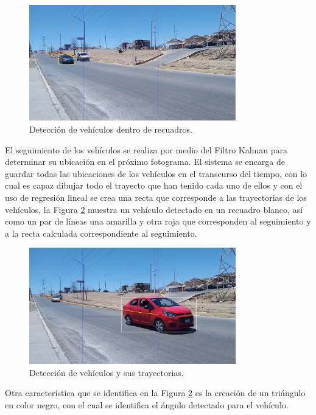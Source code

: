 \begin{figure}[H]
    \centering
    \includegraphics[width=0.8\textwidth]{Metodologia/imgs/Deteccion.jpg}
    \caption{Detección de vehículos dentro de recuadros.}
    \label{fig:LugarDeteccion}
\end{figure}

El seguimiento de los vehículos se realiza por medio del Filtro Kalman para determinar su ubicación en el próximo fotograma. El sistema se encarga de guardar todas las ubicaciones de los vehículos en el transcurso del tiempo, con lo cual es capaz dibujar todo el trayecto que han tenido cada uno de ellos y con el uso de regresión lineal se crea una recta que corresponde a las trayectorias de los vehículos, la Figura \ref{fig:LugarSeguimiento} muestra un vehículo detectado en un recuadro blanco, así como un par de líneas una amarilla y otra roja que corresponden al seguimiento y a la recta calculada correspondiente al seguimiento.

\begin{figure}[H]
    \centering
    \includegraphics[width=0.8\textwidth]{Metodologia/imgs/Seguimiento.jpg}
    \caption{Detección de vehículos y sus trayectorias.}
    \label{fig:LugarSeguimiento}
\end{figure}

Otra característica que se identifica en la Figura \ref{fig:LugarSeguimiento} es la creación de un triángulo en color negro, con el cual se identifica el ángulo detectado para el vehículo.

